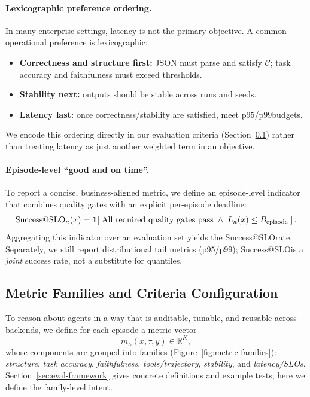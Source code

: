 \documentclass[11pt]{article}
\newcommand{\pninetyfive}{\ensuremath{\mathrm{p95}}}
\newcommand{\pninetynine}{\ensuremath{\mathrm{p99}}}
\newcommand{\slo}{\ensuremath{\mathrm{SLO}}}
\begin{document}
\paragraph{Lexicographic preference ordering.}
In many enterprise settings, latency is not the primary objective.
A common operational preference is lexicographic:
\begin{itemize}[leftmargin=12pt]
    \item \textbf{Correctness and structure first:} JSON must parse and satisfy $\mathcal{C}$; task accuracy and faithfulness must exceed thresholds.
    \item \textbf{Stability next:} outputs should be stable across runs and seeds.
    \item \textbf{Latency last:} once correctness/stability are satisfied, meet \pninetyfive/\pninetynine budgets.
\end{itemize}
We encode this ordering directly in our evaluation criteria (Section~\ref{sec:problem-metrics}) rather than treating latency as just another weighted term in an objective.

\paragraph{Episode-level ``good and on time''.}
To report a concise, business-aligned metric, we define an episode-level indicator that combines quality gates with an explicit per-episode deadline:
\[
\text{Success@\slo}_\kappa(x)=\mathbf{1}\!\left[\;\text{All required quality gates pass}\;\wedge\; L_\kappa(x)\le B_{\text{episode}}\;\right].
\]
Aggregating this indicator over an evaluation set yields the Success@\slo rate.
Separately, we still report distributional tail metrics (p95/p99); Success@\slo is a \emph{joint} success rate, not a substitute for quantiles.

\subsection{Metric Families and Criteria Configuration}
\label{sec:problem-metrics}

To reason about agents in a way that is auditable, tunable, and reusable across backends, we define for each episode a metric vector
\[
m_\kappa(x,\tau,y)\in\mathbb{R}^K,
\]
whose components are grouped into families (Figure~\ref{fig:metric-families}):
\emph{structure}, \emph{task accuracy}, \emph{faithfulness}, \emph{tools/trajectory}, \emph{stability}, and \emph{latency/SLOs}.
Section~\ref{sec:eval-framework} gives concrete definitions and example tests; here we define the family-level intent.
\end{document}
